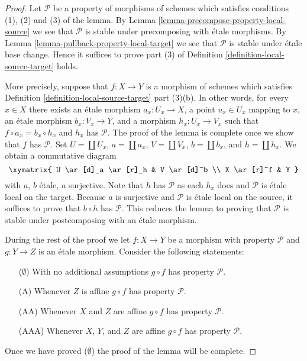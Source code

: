 \begin{proof}
Let $\mathcal{P}$ be a property of morphisms of schemes which
satisfies conditions (1), (2) and (3) of the lemma. By
Lemma \ref{lemma-precompose-property-local-source}
we see that $\mathcal{P}$ is stable under precomposing with
\'etale morphisms. By
Lemma \ref{lemma-pullback-property-local-target}
we see that $\mathcal{P}$ is stable under \'etale base change.
Hence it suffices to prove part (3) of
Definition \ref{definition-local-source-target}
holds.

\medskip\noindent
More precisely, suppose that $f : X \to Y$ is a morphism
of schemes which satisfies
Definition \ref{definition-local-source-target} part (3)(b).
In other words, for every $x \in X$ there exists an \'etale
morphism $a_x : U_x \to X$, a point $u_x \in U_x$ mapping to $x$,
an \'etale morphism $b_x : V_x \to Y$, and a morphism $h_x : U_x \to V_x$
such that $f \circ a_x = b_x \circ h_x$ and $h_x$ has $\mathcal{P}$.
The proof of the lemma is complete once we show that $f$ has $\mathcal{P}$.
Set $U = \coprod U_x$, $a = \coprod a_x$, $V = \coprod V_x$,
$b = \coprod b_x$, and $h = \coprod h_x$. We obtain a
commutative diagram
$$
\xymatrix{
U \ar[d]_a \ar[r]_h & V \ar[d]^b \\
X \ar[r]^f & Y
}
$$
with $a$, $b$ \'etale, $a$ surjective. Note that $h$ has $\mathcal{P}$
as each $h_x$ does and $\mathcal{P}$ is \'etale local on the target.
Because $a$ is surjective and $\mathcal{P}$ is \'etale local on the source,
it suffices to prove that $b \circ h$ has $\mathcal{P}$.
This reduces the lemma to proving that $\mathcal{P}$ is stable under
postcomposing with an \'etale morphism.

\medskip\noindent
During the rest of the proof we let $f : X \to Y$ be a
morphism with property $\mathcal{P}$ and $g : Y \to Z$ is an \'etale
morphism. Consider the following statements:
\begin{enumerate}
\item[($\emptyset$)] With no additional assumptions $g \circ f$
has property $\mathcal{P}$.
\item[(A)] Whenever $Z$ is affine
$g \circ f$ has property $\mathcal{P}$.
\item[(AA)] Whenever $X$ and $Z$ are affine
$g \circ f$ has property $\mathcal{P}$.
\item[(AAA)] Whenever $X$, $Y$, and $Z$ are affine
$g \circ f$ has property $\mathcal{P}$.
\end{enumerate}
Once we have proved ($\emptyset$) the proof of the lemma will be complete.


\end{proof}
